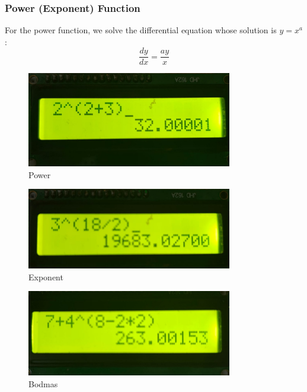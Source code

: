 \documentclass[a4paper,12pt]{article}
\begin{document}
\subsubsection*{Power (Exponent) Function}

For the power function, we solve the differential equation whose solution is $y = x^a$:
\[
\frac{dy}{dx} = \frac{ay}{x}
\]


\begin{figure}
  \begin{center}
    \includegraphics[width=0.8\textwidth]{figs/pow.png}
  \end{center}
  \caption{Power}
  \label{fig:Power}
\end{figure}
\begin{figure}
  \begin{center}
    \includegraphics[width=0.8\textwidth]{figs/pow1.png}
  \end{center}
  \caption{Exponent}
  \label{fig:Exponent}
\end{figure}
\begin{figure}
  \begin{center}
    \includegraphics[width=0.8\textwidth]{figs/bod.png}
  \end{center}
  \caption{Bodmas}
  \label{fig:Bodmas}
\end{figure}
\end{document}
